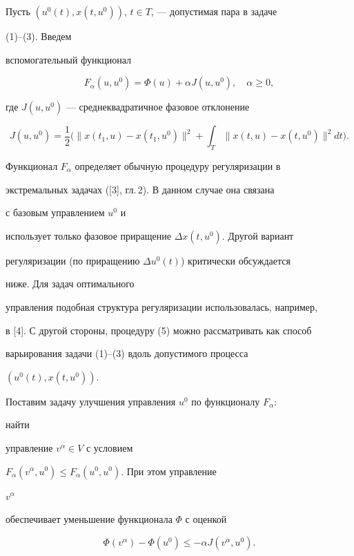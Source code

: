 Пусть $(u^0(t),x(t,u^0))$, $t\in T$, --- допустимая пара в задаче 


(1)--(3). Введем 


вспомогательный функционал 


\begin{equation} 


F_\alpha(u,u^0)=\Phi(u)+\alpha J(u,u^0),\quad \alpha\ge 0, 


\end{equation} 


где $J(u,u^0)$ --- среднеквадратичное фазовое отклонение 


$$ 


J(u,u^0)=\frac{1}{2}\bigg(\|x(t_1,u)-x(t_1,u^0)\|^2+ 


\int_T\|x(t,u)-x(t,u^0)\|^2dt\bigg). 


$$ 


Функционал $F_\alpha$ определяет обычную процедуру регуляризации в 


экстремальных задачах ([3], гл.\,2). В данном случае она связана 


с базовым управлением $u^0$ и 


использует только фазовое приращение $\Delta x(t,u^0)$. Другой вариант 


регуляризации (по приращению $\Delta u^0(t)$) критически обсуждается 


ниже. Для задач оптимального 


управления подобная структура регуляризации использовалась, например, 


в [4]. С другой стороны, процедуру (5) можно рассматривать как способ 


варьирования задачи (1)--(3) вдоль допустимого процесса 


$(u^0(t),x(t,u^0))$. 


 


Поставим задачу улучшения управления $u^0$ по функционалу $F_\alpha$: 


найти 


управление $v^\alpha\in V$ с условием 


$F_\alpha(v^\alpha,u^0)\le{}F_\alpha(u^0,u^0)$. При этом управление 


$v^\alpha$ 


обеспечивает уменьшение функционала $\Phi$ с оценкой 


\begin{equation} 


\Phi(v^\alpha)-\Phi(u^0)\le-\alpha J(v^\alpha,u^0). 


\end{equation} 


